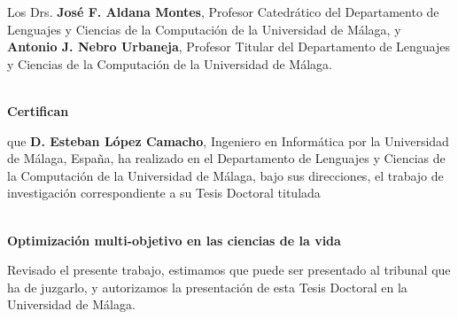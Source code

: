 \clearpage \thispagestyle{empty}

\noindent Los Drs. \textbf{José F. Aldana Montes}, Profesor Catedrático del Departamento de Lenguajes y Ciencias de la Computación de la Universidad de Málaga, y \textbf{Antonio J. Nebro Urbaneja}, Profesor Titular del Departamento de Lenguajes y Ciencias de la Computación de la Universidad de Málaga.
\\
\\
\par
\par
\noindent \textbf{Certifican}
\vspace{10mm}
\par
\par
\noindent que \textbf{D. Esteban López Camacho}, Ingeniero en Informática por la Universidad de Málaga, España, ha realizado en el Departamento de Lenguajes y Ciencias de la Computación de la Universidad de Málaga, bajo sus direcciones, el trabajo de investigación correspondiente a su Tesis Doctoral titulada
\\
\\
\begin{center}
	\textbf{Optimización multi-objetivo en las ciencias de la vida}
\end{center}

\vspace{20mm}
Revisado el presente trabajo, estimamos que puede ser presentado al tribunal que ha de juzgarlo, y autorizamos la presentación de esta Tesis Doctoral en la Universidad de Málaga.\\
\vspace{10mm}

\begin{flushleft}
\end{flushleft}
